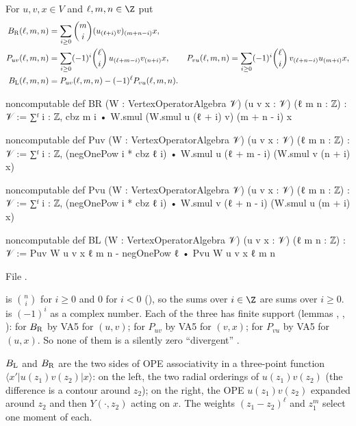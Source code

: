 \begin{definition}\label{l03:def:BLBR}
For $u,v,x\in V$ and $\ell,m,n\in\Z$ put
\begin{align*}
B_{\mathrm R}(\ell,m,n) &= \sum_{i\ge0}\binom mi(u_{(\ell+i)}v)_{(m+n-i)}x,\\
P_{uv}(\ell,m,n) &= \sum_{i\ge0}(-1)^i\binom\ell i\,u_{(\ell+m-i)}v_{(n+i)}x,\qquad
P_{vu}(\ell,m,n) = \sum_{i\ge0}(-1)^i\binom\ell i\,v_{(\ell+n-i)}u_{(m+i)}x,\\
B_{\mathrm L}(\ell,m,n) &= P_{uv}(\ell,m,n) - (-1)^\ell P_{vu}(\ell,m,n).
\end{align*}
\end{definition}
\begin{leancode}
noncomputable def BR (W : VertexOperatorAlgebra 𝒱) (u v x : 𝒱) (ℓ m n : ℤ) : 𝒱 :=
  ∑ᶠ i : ℤ, cbz m i • W.smul (W.smul u (ℓ + i) v) (m + n - i) x

noncomputable def Puv (W : VertexOperatorAlgebra 𝒱) (u v x : 𝒱) (ℓ m n : ℤ) : 𝒱 :=
  ∑ᶠ i : ℤ, (negOnePow i * cbz ℓ i) • W.smul u (ℓ + m - i) (W.smul v (n + i) x)

noncomputable def Pvu (W : VertexOperatorAlgebra 𝒱) (u v x : 𝒱) (ℓ m n : ℤ) : 𝒱 :=
  ∑ᶠ i : ℤ, (negOnePow i * cbz ℓ i) • W.smul v (ℓ + n - i) (W.smul u (m + i) x)

noncomputable def BL (W : VertexOperatorAlgebra 𝒱) (u v x : 𝒱) (ℓ m n : ℤ) : 𝒱 :=
  Puv W u v x ℓ m n - negOnePow ℓ • Pvu W u v x ℓ m n
\end{leancode}
File .

\begin{dictionary}
 is $\binom ni$ for $i\ge0$ and $0$ for $i<0$ (), so the sums over $i\in\Z$ are sums over $i\ge0$.  is $(-1)^i$
as a complex number. Each of the three  has finite support (lemmas ,
, ): for $B_{\mathrm R}$ by VA5 for $(u,v)$; for $P_{uv}$ by VA5 for $(v,x)$; for
$P_{vu}$ by VA5 for $(u,x)$. So none of them is a silently zero ``divergent'' .
\end{dictionary}

\begin{physics}
$B_{\mathrm L}$ and $B_{\mathrm R}$ are the two sides of OPE associativity in a three-point function
$\langle x'|u(z_1)v(z_2)|x\rangle$: on the left, the two radial orderings of $u(z_1)v(z_2)$ (the
difference is a contour around $z_2$); on the right, the OPE $u(z_1)v(z_2)$ expanded around $z_2$ and
then $Y(\cdot,z_2)$ acting on $x$. The weights $(z_1-z_2)^\ell$ and $z_1^m$ select one moment of each.
\end{physics}

